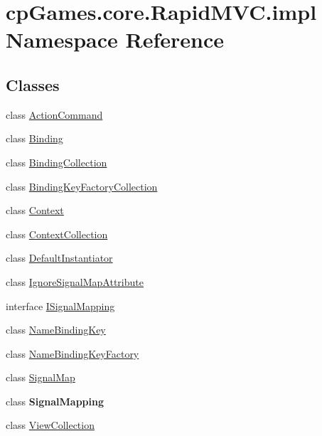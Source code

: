 \hypertarget{namespacecp_games_1_1core_1_1_rapid_m_v_c_1_1impl}{}\section{cp\+Games.\+core.\+Rapid\+M\+V\+C.\+impl Namespace Reference}
\label{namespacecp_games_1_1core_1_1_rapid_m_v_c_1_1impl}
\subsection*{Classes}
\begin{DoxyCompactItemize}
\item 
class \mbox{\hyperlink{classcp_games_1_1core_1_1_rapid_m_v_c_1_1impl_1_1_action_command}{Action\+Command}}
\item 
class \mbox{\hyperlink{classcp_games_1_1core_1_1_rapid_m_v_c_1_1impl_1_1_binding}{Binding}}
\item 
class \mbox{\hyperlink{classcp_games_1_1core_1_1_rapid_m_v_c_1_1impl_1_1_binding_collection}{Binding\+Collection}}
\item 
class \mbox{\hyperlink{classcp_games_1_1core_1_1_rapid_m_v_c_1_1impl_1_1_binding_key_factory_collection}{Binding\+Key\+Factory\+Collection}}
\item 
class \mbox{\hyperlink{classcp_games_1_1core_1_1_rapid_m_v_c_1_1impl_1_1_context}{Context}}
\item 
class \mbox{\hyperlink{classcp_games_1_1core_1_1_rapid_m_v_c_1_1impl_1_1_context_collection}{Context\+Collection}}
\item 
class \mbox{\hyperlink{classcp_games_1_1core_1_1_rapid_m_v_c_1_1impl_1_1_default_instantiator}{Default\+Instantiator}}
\item 
class \mbox{\hyperlink{classcp_games_1_1core_1_1_rapid_m_v_c_1_1impl_1_1_ignore_signal_map_attribute}{Ignore\+Signal\+Map\+Attribute}}
\item 
interface \mbox{\hyperlink{interfacecp_games_1_1core_1_1_rapid_m_v_c_1_1impl_1_1_i_signal_mapping}{I\+Signal\+Mapping}}
\item 
class \mbox{\hyperlink{classcp_games_1_1core_1_1_rapid_m_v_c_1_1impl_1_1_name_binding_key}{Name\+Binding\+Key}}
\item 
class \mbox{\hyperlink{classcp_games_1_1core_1_1_rapid_m_v_c_1_1impl_1_1_name_binding_key_factory}{Name\+Binding\+Key\+Factory}}
\item 
class \mbox{\hyperlink{classcp_games_1_1core_1_1_rapid_m_v_c_1_1impl_1_1_signal_map}{Signal\+Map}}
\item 
class {\bfseries Signal\+Mapping}
\item 
class \mbox{\hyperlink{classcp_games_1_1core_1_1_rapid_m_v_c_1_1impl_1_1_view_collection}{View\+Collection}}
\end{DoxyCompactItemize}
